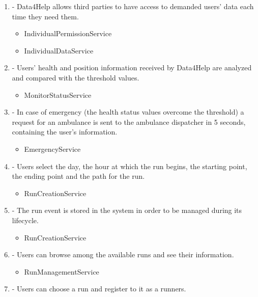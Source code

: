 \documentclass[a4paper]{article}
\begin{document}
\begin{enumerate}[label*=\bf{R.\arabic*}]
\item - Data4Help allows third parties to have access to demanded users’
data each time they need them.

\begin{itemize}
\item IndividualPermissionService
\item IndividualDataService
\end{itemize}

\item - Users’ health and position information received by Data4Help are
analyzed and compared with the threshold values.

\begin{itemize}
\item MonitorStatusService
\end{itemize}

\item - In case of emergency (the health status values overcome the threshold) a request for an ambulance is sent to the ambulance dispatcher
in 5 seconds, containing the user’s information.

\begin{itemize}
\item EmergencyService
\end{itemize}

\item - Users select the day, the hour at which the run begins, the starting
point, the ending point and the path for the run.

\begin{itemize}
\item RunCreationService
\end{itemize}

\item - The run event is stored in the system in order to be managed during
its lifecycle.

\begin{itemize}
\item RunCreationService
\end{itemize}

\item - Users can browse among the available runs and see their information.

\begin{itemize}
\item RunManagementService
\end{itemize}

\item - Users can choose a run and register to it as a runners.


\end{enumerate}
\end{document}
